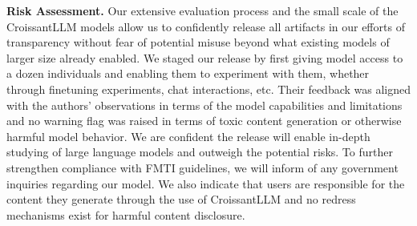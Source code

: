 \textbf{Risk Assessment.} Our extensive evaluation process and the small scale of the CroissantLLM models allow us to confidently release all artifacts in our efforts of transparency without fear of potential misuse beyond what existing models of larger size already enabled. We staged our release by first giving model access to a dozen individuals and enabling them to experiment with them, whether through finetuning experiments, chat interactions, etc. Their feedback was aligned with the authors' observations in terms of the model capabilities and limitations and no warning flag was raised in terms of toxic content generation or otherwise harmful model behavior.  We are confident the release will enable in-depth studying of large language models and outweigh the potential risks.
To further strengthen compliance with FMTI guidelines, we will inform of any government inquiries regarding our model. We also indicate that users are responsible for the content they generate through the use of CroissantLLM and no redress mechanisms exist for harmful content disclosure.
